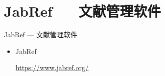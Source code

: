\documentclass[13pt]{ctexbeamer}
\begin{document}
\section{JabRef --- 文献管理软件}
\begin{frame}{JabRef  --- 文献管理软件}
\begin{itemize}
\item  JabRef

\href{https://www.jabref.org/}{https://www.jabref.org/}
\end{itemize}
\end{frame}
\end{document}
